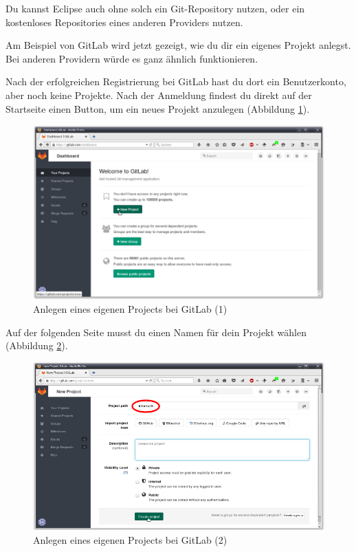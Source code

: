 Du kannst Eclipse auch ohne solch ein Git-Repository nutzen, oder ein
kostenloses Repositories eines anderen Providers nutzen.

\afterpage{\clearpage}

Am Beispiel von GitLab wird jetzt gezeigt, wie du dir ein eigenes Projekt
anlegst. Bei anderen Providern würde es ganz ähnlich funktionieren.

Nach der erfolgreichen Registrierung bei GitLab hast du dort ein Benutzerkonto,
aber noch keine Projekte. Nach der Anmeldung findest du direkt auf der
Startseite einen Button, um ein neues Projekt anzulegen (Abbildung
\ref{fig:gitlab-new-project-1}).

\begin{figure}[h]
  \centering
   \includegraphics[width=1.0\textwidth]{./inf/SEKII/01_Vorbereitung/GitLab_New_Project_1.png}
   \caption{Anlegen eines eigenen Projects bei GitLab (1)}
   \label{fig:gitlab-new-project-1}
\end{figure}

Auf der folgenden Seite musst du einen Namen für dein Projekt wählen (Abbildung
\ref{fig:gitlab-new-project-2}).

\begin{figure}[h]
  \centering
   \includegraphics[width=1.0\textwidth]{./inf/SEKII/01_Vorbereitung/GitLab_New_Project_2.png}
   \caption{Anlegen eines eigenen Projects bei GitLab (2)}
   \label{fig:gitlab-new-project-2}
\end{figure}

